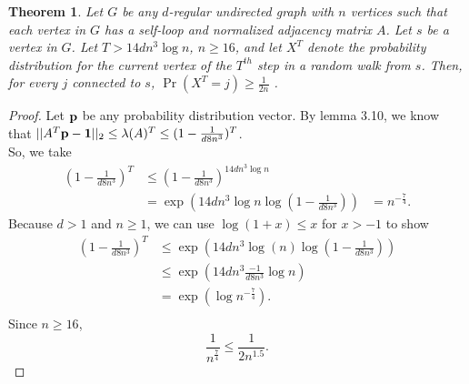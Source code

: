 \documentclass[psamsfonts, 10pt]{amsart}
\newtheorem{thm}{Theorem}[section]
\theoremstyle{definition}
\theoremstyle{remark}
\numberwithin{equation}{section}
\begin{document}
\begin{thm}
Let $G$ be any $d$-regular undirected graph with $n$ vertices such that each vertex in $G$ has a self-loop and normalized adjacency matrix $A$. Let $s$ be a vertex in $G$. Let $T > 14dn^3\log{n}$, $n \geq 16$,  and let $X^T$ denote  the probability distribution for the current vertex of the $T^{th}$ step in a random walk from $s$. Then, for every $j$ connected to $s$, $\Pr(X^T = j) \geq \frac{1}{2n}$ .
\end{thm}
\begin{proof}
Let ${\bf p}$ be any probability distribution vector. By lemma 3.10, we know that $\lvert \lvert A^T{\bf p} - {\bf 1} \rvert \rvert_2 \leq \lambda(A)^T \leq (1 - \frac{1}{d8n^3})^T$.\\
So, we take
\[
\begin{aligned}
(1 - \frac{1}{d8n^3})^T  &\leq (1 - \frac{1}{d8n^3})^{14dn^3\log{n}}\\
&= \exp\left(14dn^3\log{n}\log{\left(1 - \frac{1}{d8n^3}\right)}\right)
&= n^{-\frac{7}{4}}.
\end{aligned}
\]
Because $d > 1$ and $n \geq 1$, we can use $\log{(1 + x)} \leq x$ for $x > -1$ to show 
\[
\begin{aligned}
(1 - \frac{1}{d8n^3})^T  &\leq \exp\left(14dn^3\log(n)\log{\left(1 - \frac{1}{d8n^3}\right)}\right)\\
&\leq \exp\left(14dn^3\frac{-1}{d8n^3}\log{n}\right)\\
&= \exp\left(\log{n^{-\frac{7}{4}}}\right).\\
\end{aligned}
\]
Since $n \geq 16$,
\[\frac{1}{n^{\frac{7}{4}}} \leq \frac{1}{2n^{1.5}}.\]


\end{proof}
\end{document}
